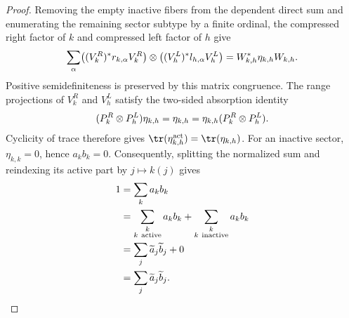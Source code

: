 \begin{proof}
    \leanok
    Removing the empty inactive fibers from the dependent direct sum and
    enumerating the remaining sector subtype by a finite ordinal, the
    compressed right factor of $k$ and compressed left factor of $h$ give
    \begin{align}
        \sum_\alpha
        \bigl((V_k^R)^*r_{k,\alpha}V_k^R\bigr)
        \otimes
        \bigl((V_h^L)^*l_{h,\alpha}V_h^L\bigr)
        =W_{k,h}^*\eta_{k,h}W_{k,h}.
        \notag
    \end{align}
    Positive semidefiniteness is preserved by this matrix congruence.
    The range projections of $V_k^R$ and $V_h^L$ satisfy the two-sided
    absorption identity
    \begin{align}
        (P_k^R\otimes P_h^L)\eta_{k,h}
        =\eta_{k,h}
        =\eta_{k,h}(P_k^R\otimes P_h^L).
        \notag
    \end{align}
    Cyclicity of trace therefore gives
    $\tr(\eta^{\mathrm{act}}_{k,h})=\tr(\eta_{k,h})$.  For an inactive
    sector, $\eta_{k,k}=0$, hence $a_kb_k=0$.  Consequently, splitting the
    normalized sum and reindexing its active part by $j\mapsto k(j)$ gives
    \begin{align}
        1 & = \sum_k a_kb_k
        \notag                                    \\
          & =\sum_{\substack{k                    \\ k\ \mathrm{active}}}a_kb_k
        +\sum_{\substack{k                        \\ k\ \mathrm{inactive}}}a_kb_k
        \notag                                    \\
          & =\sum_j\widetilde a_j\widetilde b_j+0
        \notag                                    \\
          & =\sum_j\widetilde a_j\widetilde b_j.
        \notag
    \end{align}
\end{proof}

